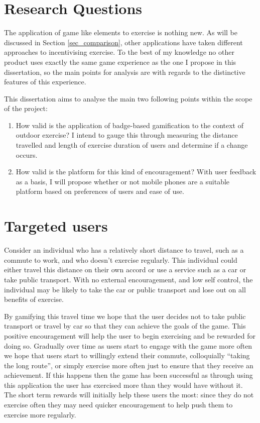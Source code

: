 \section{Research Questions}

The application of game like elements to exercise is nothing new. As
will be
discussed in Section \ref{sec_comparison}, other applications have
taken different approaches to incentivising exercise. To the best of
my knowledge no other product uses exactly the same game experience as
the one I propose in this dissertation, so the main points for
analysis are with regards to the distinctive features of this
experience. 

This dissertation aims to analyse the main two following points within
the scope of the project:

\begin{enumerate}
  \item How valid is the application of badge-based gamification to
    the context of outdoor exercise? I intend to gauge this through
    measuring the distance travelled and length of exercise duration
    of users and determine if a change occurs.
  \item How valid is the platform for this kind of encouragement?
    With user feedback as a basis, I will propose whether or not
    mobile phones are a suitable platform based on preferences of
    users and ease of use.
\end{enumerate}


\section{Targeted users}

Consider an individual who has a relatively short distance to travel,
such as a commute to work,
and who doesn't exercise regularly. This individual could either
travel this distance on their own accord or use a service such as a
car or take public transport. With no external encouragement, and low
self control, the individual may be likely to take the car or public
transport and lose out on all benefits of exercise. 

By gamifying this travel time we hope that the user decides not to
take public transport or travel by car so that they can achieve the
goals of the game. This positive encouragement will help the user to
begin exercising and be rewarded for doing so. Gradually over time as
users start to engage with the game more often we hope that users
start to willingly extend their commute, colloquially ``taking the
long route'', or simply exercise more often just to ensure that they
receive an achievement. If this happens then the game has been
successful as through using this application the user has exercised
more than they would have without it. The short term rewards will
initially help these users the most: since they do not exercise
often they may need quicker encouragement to help push them to
exercise more regularly.

